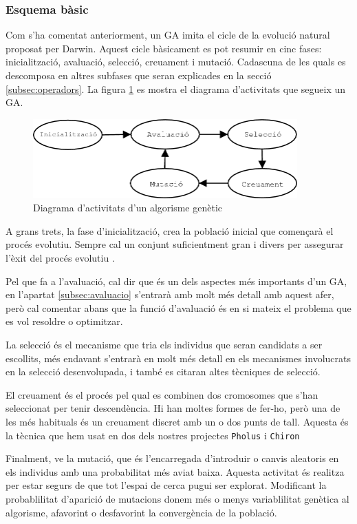 \documentclass[titlepage,a4paper,12pt]{book}
\begin{document}
\subsubsection{Esquema bàsic}

Com s'ha comentat anteriorment, un GA imita el cicle de la evolució natural
proposat per Darwin. Aquest cicle bàsicament es pot resumir en cinc fases:
inicialització, avaluació, selecció, creuament i mutació. Cadascuna de les quals
es descomposa en altres subfases que seran explicades en la secció
\ref{subsec:operadors}. La figura \ref{fig:ga} es mostra el diagrama
d'activitats que segueix un GA.

\begin{figure} \centering \includegraphics[width=4in]{intro/ga}
\caption{\label{fig:ga}Diagrama d'activitats d'un algorisme genètic}
\end{figure}

A grans trets, la fase d'inicialització, crea la població inicial que començarà
el procés evolutiu. Sempre cal un conjunt suficientment gran i divers per
assegurar l'èxit del procés evolutiu \cite{G02}.

Pel que fa a l'avaluació, cal dir que és un dels aspectes més importants d'un
GA, en l'apartat \ref{subsec:avaluacio} s'entrarà amb molt més detall amb aquest
afer, però cal comentar abans que la funció d'avaluació és en si mateix el
problema que es vol resoldre o optimitzar.

La selecció és el mecanisme que tria els individus que seran candidats a ser
escollits, més endavant s'entrarà en molt més detall en els mecanismes
involucrats en la selecció desenvolupada, i també es citaran altes tècniques de
selecció.

El creuament és el procés pel qual es combinen dos cromosomes que s'han
seleccionat per tenir descendència. Hi han moltes formes de fer-ho, però una de
les més habituals és un creuament discret amb un o dos punts de tall.  Aquesta
és la tècnica que hem usat en dos dels nostres projectes \texttt{Pholus} i
\texttt{Chiron}  %

Finalment, ve la mutació, que és l'encarregada d'introduir o canvis aleatoris en
els individus amb una probabilitat més aviat baixa. Aquesta activitat és
realitza per estar segurs de que tot l'espai de cerca pugui ser explorat.
Modificant la probablilitat d'aparició de mutacions donem més o menys
variablilitat genètica al algorisme, afavorint o desfavorint la convergència de
la població.
\end{document}
